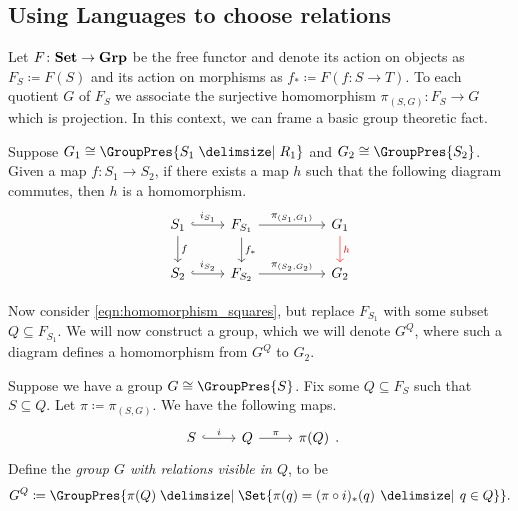 
\subsection{Using Languages to choose relations}

Let $F \colon \mathbf{Set} \to \mathbf{Grp}$ be the free functor and denote its action on objects as $F_S \coloneqq F(S)$ and its action on morphisms as  $f_* \coloneqq F(f \colon S \to T)$.
To each quotient $G$ of $F_S$ we associate the surjective homomorphism $\pi_{(S,G)} \colon F_S \to G$ which is projection.
In this context, we can frame a basic group theoretic fact.

\begin{basic_fact}
	Suppose $G_1 \cong \GroupPres{S_1 \relations R_1}$ and $G_2 \cong \GroupPres{S_2}$.
	Given a map $f \colon S_1 \to S_2$, if there exists a map  $h$ such that the following diagram commutes, then $h$ is a homomorphism.
	\begin{equation}
		\begin{tikzcd}
			S_1 \ar[d, "f"] \ar[r, hook, "i_{S_1}"] & F_{S_1} \ar[d, "f_*"] \ar[rr, "\pi_{(S_1, G_1)}"] & & \ar[d, color=red, "h"] G_1 \\
			S_2 \ar[r, hook, "i_{S_2}"] & F_{S_2} \ar[rr, "\pi_{(S_2, G_2)}"] & & G_2
		\end{tikzcd}
		\label{eqn:homomorphism_squares}
	\end{equation}
	\label{thm:homomorphism_squares}
\end{basic_fact}

Now consider \eqref{eqn:homomorphism_squares}, but replace $F_{S_1}$ with some subset $Q \subseteq F_{S_1}$.
We will now construct a group, which we will denote $G^Q$, where such a diagram defines a homomorphism from $G^Q$ to $G_2$.

\begin{definition}
	Suppose we have a group $G \cong \GroupPres{S}$.
	Fix some $Q \subseteq F_S$ such that $S \subseteq Q$.
	Let $\pi \coloneq \pi_{(S,G)}$.
	We have the following maps.
	\[
		\begin{tikzcd}
			S \ar[r, hook, "i"] & Q \ar[r, "\pi"] & \pi(Q)
		\end{tikzcd}
		.\]
	Define the \emph{group $G$ with relations visible in $Q$}, to be
	\[
		G^Q \coloneqq \GroupPres{\pi(Q) \relations \Set{\pi(q) = (\pi \circ i)_*(q) \given q \in Q} }
		.\]
	\label{def:G_Q}
\end{definition}

